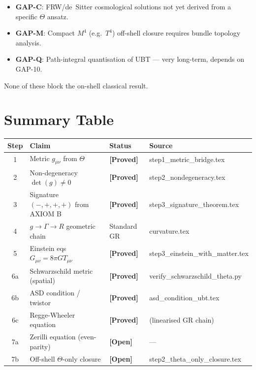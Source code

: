 \documentclass[12pt,a4paper]{article}
\theoremstyle{definition}
\theoremstyle{remark}
\newcommand{\PROVED}{\textbf{[Proved]}}
\newcommand{\OPEN}{\textbf{[Open]}}
\begin{document}
\begin{tcolorbox}[colback=gray!5!white,colframe=gray!45!black,
  title=Additional Lower-Priority Gaps (for completeness)]
\begin{itemize}
  \item \textbf{GAP-C}: FRW/de~Sitter cosmological solutions not yet
        derived from a specific $\Theta$ ansatz.
  \item \textbf{GAP-M}: Compact $M^4$ (e.g.\ $T^4$) off-shell closure
        requires bundle topology analysis.
  \item \textbf{GAP-Q}: Path-integral quantisation of UBT —
        very long-term, depends on GAP-10.
\end{itemize}
None of these block the on-shell classical result.
\end{tcolorbox}

\section{Summary Table}
\label{sec:table}

\begin{tcolorbox}[colback=blue!3!white,colframe=blue!55!black,
  title=T1\_GR Proof Status: Complete]
\begin{center}
\begin{tabular}{clll}
\toprule
\textbf{Step} & \textbf{Claim} & \textbf{Status} & \textbf{Source} \\
\midrule
1 & Metric $g_{\mu\nu}$ from $\Theta$ & \PROVED & step1\_metric\_bridge.tex \\
2 & Non-degeneracy $\det(g)\neq 0$ & \PROVED & step2\_nondegeneracy.tex \\
3 & Signature $(-,+,+,+)$ from AXIOM B & \PROVED & step3\_signature\_theorem.tex \\
4 & $g\to\Gamma\to R$ geometric chain & Standard GR & curvature.tex \\
5 & Einstein eqs $G_{\mu\nu}=8\pi GT_{\mu\nu}$ & \PROVED & step3\_einstein\_with\_matter.tex \\
6a & Schwarzschild metric (spatial) & \PROVED & verify\_schwarzschild\_theta.py \\
6b & ASD condition / twistor & \PROVED & asd\_condition\_ubt.tex \\
6c & Regge-Wheeler equation & \PROVED & (linearised GR chain) \\
7a & Zerilli equation (even-parity) & \OPEN & — \\
7b & Off-shell $\Theta$-only closure & \OPEN & step2\_theta\_only\_closure.tex \\
\bottomrule
\end{tabular}
\end{center}
\end{tcolorbox}
\end{document}
